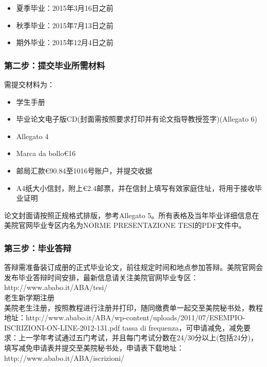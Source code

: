 \documentclass[3pt,a5paper,openright,twoside]{book}
\begin{document}
\begin{itemize}
  \item 夏季毕业：2015年3月16日之前
  \item 秋季毕业：2015年7月13日之前
  \item 期外毕业：2015年12月4日之前
\end{itemize}

\subsubsection{第二步：提交毕业所需材料}
需提交材料为：
\begin{itemize}
  \item 学生手册
  \item 毕业论文电子版CD(封面需按照要求打印并有论文指导教授签字)(Allegato 6)
  \item Allegato 4
  \item Marca da bollo€16
  \item 邮局汇款€90.84至1016号账户，并提交收据
  \item A4纸大小信封，附上€2.4邮票，并在信封上填写有效家庭住址，将用于接收毕业证明
\end{itemize}
论文封面请按照正规格式排版，参考Allegato 5。所有表格及当年毕业详细信息在美院官网毕业专区内名为NORME PRESENTAZIONE TESI的PDF文件中。


\subsubsection{第三步：毕业答辩}
答辩需准备装订成册的正式毕业论文，前往规定时间和地点参加答辩。美院官网会发布毕业答辩时间安排，最新信息请关注美院官网毕业专区：http://www.ababo.it/ABA/tesi/\\


老生新学期注册\\
美院老生注册，按照教程进行注册并打印，随同缴费单一起交至美院秘书处，教程地址：http://www.ababo.it/ABA/wp-content/uploads/2011/07/ESEMPIO-ISCRIZIONI-ON-LINE-2012-131.pdf
tassa di frequenza，可申请减免，减免要求：上一学年考试通过五门考试，并且每门考试分数在24/30分以上(包括24分)，填写减免申请表并提交至美院秘书处，申请表下载地址：http://www.ababo.it/ABA/iscrizioni/
\end{document}
